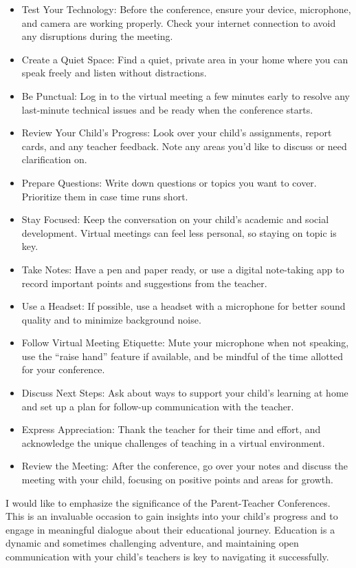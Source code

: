 \documentclass[12pt,letterpaper]{article}
\begin{document}
\begin{itemize}
\item Test Your Technology: Before the conference, ensure your device, microphone, and camera are working properly. Check your internet connection to avoid any disruptions during the meeting.
\item Create a Quiet Space: Find a quiet, private area in your home where you can speak freely and listen without distractions.
\item Be Punctual: Log in to the virtual meeting a few minutes early to resolve any last-minute technical issues and be ready when the conference starts.
\item Review Your Child’s Progress: Look over your child’s assignments, report cards, and any teacher feedback. Note any areas you’d like to discuss or need clarification on.
\item Prepare Questions: Write down questions or topics you want to cover. Prioritize them in case time runs short.
\item Stay Focused: Keep the conversation on your child’s academic and social development. Virtual meetings can feel less personal, so staying on topic is key.
\pagebreak
\vspace*{.5in}
\item Take Notes: Have a pen and paper ready, or use a digital note-taking app to record important points and suggestions from the teacher.
\item Use a Headset: If possible, use a headset with a microphone for better sound quality and to minimize background noise.
\item Follow Virtual Meeting Etiquette: Mute your microphone when not speaking, use the “raise hand” feature if available, and be mindful of the time allotted for your conference.
\item Discuss Next Steps: Ask about ways to support your child’s learning at home and set up a plan for follow-up communication with the teacher.
\item Express Appreciation: Thank the teacher for their time and effort, and acknowledge the unique challenges of teaching in a virtual environment.
\item Review the Meeting: After the conference, go over your notes and discuss the meeting with your child, focusing on positive points and areas for growth.
\end{itemize}

I would like to emphasize the significance of the Parent-Teacher Conferences. This is an invaluable occasion to gain insights into your child’s progress and to engage in meaningful dialogue about their educational journey. Education is a dynamic and sometimes challenging adventure, and maintaining open communication with your child’s teachers is key to navigating it successfully.
\end{document}

